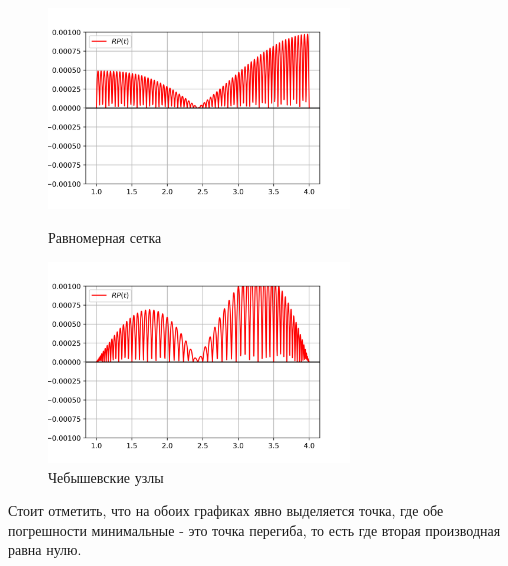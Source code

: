 \begin{figure}[h!]
	\centering                                                                                            
	\begin{minipage}{0.45\textwidth}
	        \centering
	        \includegraphics[width=8cm]{images/plot_4.2_err_Spline_equal.png} %
	        \caption{Равномерная сетка}
	\end{minipage}\hfill
	\begin{minipage}{0.45\textwidth}
		\centering
		\includegraphics[width=8cm]{images/plot_4.2_err_Spline_Chebyschev.png} %
		\caption{Чебышевские узлы}
	\end{minipage}
\end{figure}

Стоит отметить, что на обоих графиках явно выделяется точка, где обе погрешности минимальные - это точка перегиба, то есть где вторая производная равна нулю.

